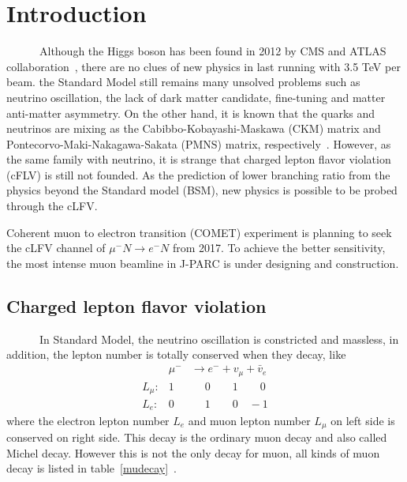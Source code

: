 \chapter{Introduction}
~~~~~~Although the Higgs boson has been found in 2012 by CMS and ATLAS collaboration~\cite{higgs}, there are no clues of new physics in last running with 3.5 TeV per beam.
the Standard Model still remains many unsolved problems such as neutrino oscillation, the lack of dark matter candidate, fine-tuning and matter anti-matter asymmetry.
On the other hand, it is known that the quarks and neutrinos are mixing as the Cabibbo-Kobayashi-Maskawa (CKM) matrix and Pontecorvo-Maki-Nakagawa-Sakata (PMNS) matrix, respectively~\cite{mark}.
However, as the same family with neutrino, it is strange that charged lepton flavor violation (cFLV) is still not founded.
As the prediction of lower branching ratio from the physics beyond the Standard model (BSM), new physics is possible to be probed through the cLFV.

Coherent muon to electron transition (COMET) experiment is planning to seek the cLFV channel of $\mu^- N \rightarrow e^- N$ from 2017.
To achieve the better sensitivity, the most intense muon beamline in J-PARC is under designing and construction.

\section{Charged lepton flavor violation}
~~~~~~In Standard Model, the neutrino oscillation is constricted and massless, in addition, the lepton number is totally conserved when they decay, like
\begin{eqnarray*}
 & \mu^- & \rightarrow  e^-  +  v_\mu  +  \bar v_e  \\
 L_\mu: & 1 & \quad\; 0 \qquad 1 \qquad\! 0 \\
 L_e: & 0 &   \quad\; 1 \qquad 0 \quad -1 
\end{eqnarray*}
where the electron lepton number $L_e$ and muon lepton number $L_\mu$ on left side is conserved on right side.
This decay is the ordinary muon decay and also called Michel decay.
However this is not the only decay for muon, all kinds of muon decay is listed in table~\ref{mudecay}~\cite{pdg}.

